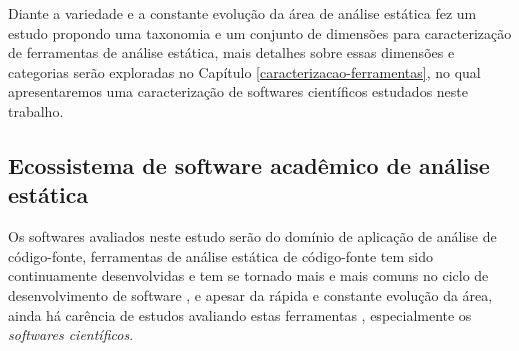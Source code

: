 Diante a variedade e a constante evolução da área de análise estática
 fez um estudo propondo uma taxonomia e um conjunto de
dimensões para caracterização de ferramentas de análise estática, mais detalhes
sobre essas dimensões e categorias serão exploradas no Capítulo
\ref{caracterizacao-ferramentas}, no qual apresentaremos uma caracterização de
softwares científicos estudados neste trabalho.

\subsection{Ecossistema de software acadêmico de análise estática}

Os softwares avaliados neste estudo serão do domínio de aplicação de análise de
código-fonte, ferramentas de análise estática de código-fonte tem sido
continuamente desenvolvidas e tem se tornado mais e mais comuns no ciclo de
desenvolvimento de software \cite{Novak2010}, e apesar da rápida e constante
evolução da área, ainda há carência de estudos avaliando estas ferramentas
\cite{Li2010}, especialmente os {\it softwares científicos}.
